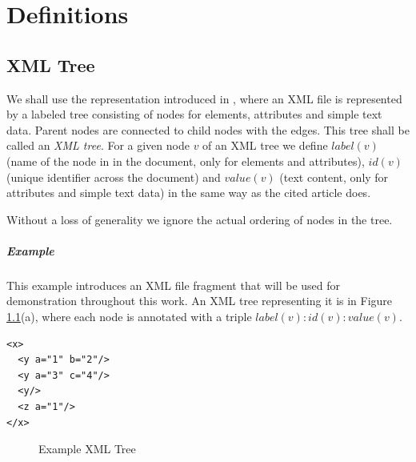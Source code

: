 \chapter{Definitions}
\label{chapter-definitions}

\section{XML Tree}

We shall use the representation introduced in \cite{fidax}, where an XML file is represented by a labeled tree consisting of nodes for elements, attributes and simple text data. Parent nodes are connected to child nodes with the edges. This tree shall be called an \textit{XML tree}. For a given node $v$ of an XML tree we define $label(v)$ (name of the node in in the document, only for elements and attributes), $id(v)$ (unique identifier across the document) and $value(v)$ (text content, only for attributes and simple text data) in the same way as the cited article does.

Without a loss of generality we ignore the actual ordering of nodes in the tree.

\paragraph{Example}

This example introduces an XML file fragment that will be used for demonstration throughout this work. An XML tree representing it is in Figure \ref{image-definitions-example-xml-tree}(a), where each node is annotated with a triple $label(v) : id(v) : value(v)$.

\begin{verbatim}
<x>
  <y a="1" b="2"/>
  <y a="3" c="4"/>
  <y/>
  <z a="1"/>
</x>
\end{verbatim}

\begin{figure}
  \caption{Example XML Tree}
  \label{image-definitions-example-xml-tree} 
  \centering
\end{figure}

